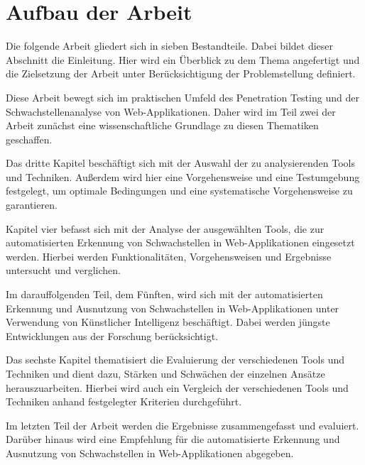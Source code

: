 \section{Aufbau der Arbeit}

Die folgende Arbeit gliedert sich in sieben Bestandteile. Dabei bildet dieser Abschnitt die Einleitung. Hier wird ein Überblick zu dem Thema angefertigt und die
Zielsetzung der Arbeit unter Berücksichtigung der Problemstellung definiert.

Diese Arbeit bewegt sich im praktischen Umfeld des Penetration Testing und der Schwachstellenanalyse von Web-Applikationen.
Daher wird im Teil zwei der Arbeit zunächst eine wissenschaftliche Grundlage zu diesen
Thematiken geschaffen.

Das dritte Kapitel beschäftigt sich mit der Auswahl der zu analysierenden Tools und Techniken. Außerdem wird hier eine Vorgehensweise und eine Testumgebung festgelegt, um optimale Bedingungen und eine systematische Vorgehensweise zu garantieren.

Kapitel vier befasst sich mit der Analyse der ausgewählten Tools, die zur automatisierten Erkennung von Schwachstellen in Web-Applikationen eingesetzt werden. Hierbei werden Funktionalitäten, Vorgehensweisen und Ergebnisse untersucht und verglichen. 

Im darauffolgenden Teil, dem Fünften, wird sich mit der automatisierten Erkennung und Ausnutzung von Schwachstellen in Web-Applikationen unter Verwendung von Künstlicher Intelligenz beschäftigt. Dabei werden jüngste Entwicklungen aus der Forschung berücksichtigt.

Das sechste Kapitel thematisiert die Evaluierung der verschiedenen Tools und Techniken und dient dazu, Stärken und Schwächen der einzelnen Ansätze herauszuarbeiten. Hierbei wird auch ein Vergleich der verschiedenen Tools und Techniken anhand festgelegter Kriterien durchgeführt.

Im letzten Teil der Arbeit werden die Ergebnisse zusammengefasst und evaluiert. Darüber hinaus wird eine Empfehlung für die automatisierte Erkennung und Ausnutzung von Schwachstellen in Web-Applikationen abgegeben.

